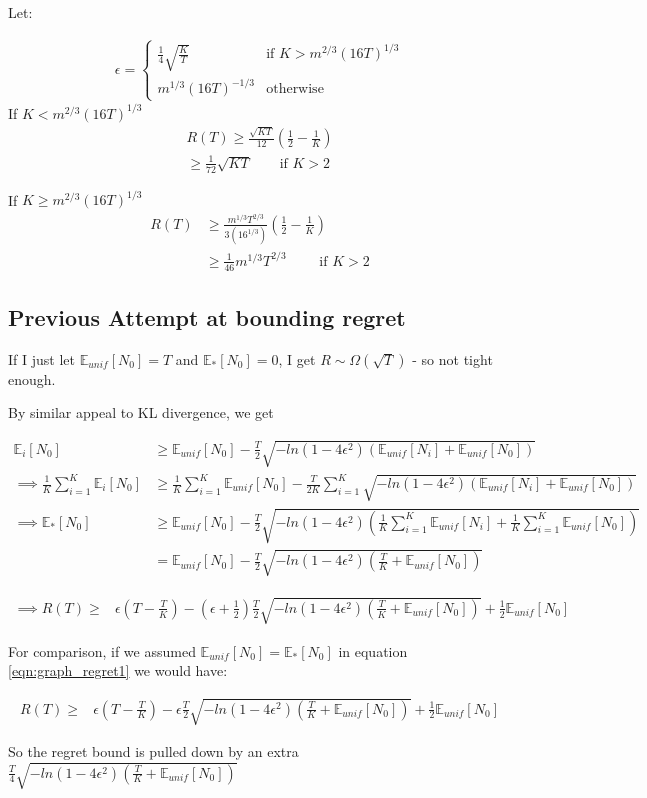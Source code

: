 \documentclass{article}
\newcommand{\E}{\mathbb E}
\newcommand{\eqn}[1]{\begin{align}#1\end{align}}
\newcommand{\bigomega}[1]{\Omega\left( #1 \right)}
\newcommand{\Ei}[1]{\E_i\left[ #1 \right]}
\newcommand{\Eu}[1]{\E_{unif}\left[ #1 \right]}
\newcommand{\Es}[1]{\E_{*}\left[ #1 \right]}
\theoremstyle{plain}
\theoremstyle{definition}
\begin{document}
Let:

\eqn{
\epsilon = \begin{cases}
\frac{1}{4}\sqrt{\frac{K}{T}} & \text{if } K > m^{2/3}(16T)^{1/3} \\
m^{1/3}(16T)^{-1/3} & \text{otherwise}
\end{cases}
}
If $K < m^{2/3}(16T)^{1/3}$
\eqn {
R(T) \geq \frac{\sqrt{KT}}{12}\left(\frac{1}{2} - \frac{1}{K}\right)\\
\geq \frac{1}{72}\sqrt{KT} \qquad \text{if } K > 2
}

If  $K \geq m^{2/3}(16T)^{1/3}$
\eqn{
R(T)& \geq \frac{m^{1/3}T^{2/3}}{3(16^{1/3})}\left(\frac{1}{2} - \frac{1}{K}\right) \\
& \geq \frac{1}{46}m^{1/3}T^{2/3} \qquad \text{ if } K > 2
}

\pagebreak
\subsection{Previous Attempt at bounding regret}

If I just let $\Eu{N_0} = T$ and $\Es{N_0} = 0$, I get $R \sim \bigomega{\sqrt{T}}$ - so not tight enough. 

By similar appeal to KL divergence, we get

\eqn {
\Ei{N_0} & \geq \Eu{N_0} - \frac{T}{2}\sqrt{-ln(1-4\epsilon^2)(\Eu{N_i}+\Eu{N_0})} \\
\implies \frac{1}{K}\sum_{i=1}^K\Ei{N_0} & \geq \frac{1}{K}\sum_{i=1}^K\Eu{N_0} - \frac{T}{2K}\sum_{i=1}^K\sqrt{-ln(1-4\epsilon^2)(\Eu{N_i}+\Eu{N_0})}\\
\implies \Es{N_0} & \geq \Eu{N_0} - \frac{T}{2}\sqrt{-ln(1-4\epsilon^2)(\frac{1}{K}\sum_{i=1}^K\Eu{N_i}+\frac{1}{K}\sum_{i=1}^K\Eu{N_0})}\\
 & = \Eu{N_0} - \frac{T}{2}\sqrt{-ln(1-4\epsilon^2)(\frac{T}{K}+\Eu{N_0})}
}

\eqn{
\label{eqn:graph_regret2}
\implies R(T) \geq & 
\epsilon(T - \frac{T}{K})-(\epsilon + \frac{1}{2})\frac{T}{2}\sqrt{-ln(1-4\epsilon^2)(\frac{T}{K}+\Eu{N_0})} +\frac{1}{2}\Eu{N_0} 
}

For comparison, if we assumed $\Eu{N_0}=\Es{N_0}$ in equation \ref{eqn:graph_regret1} we would have:

\eqn{
R(T) \geq & 
\epsilon(T - \frac{T}{K})-\epsilon\frac{T}{2}\sqrt{-ln(1-4\epsilon^2)(\frac{T}{K}+\Eu{N_0})} +\frac{1}{2}\Eu{N_0} 
}

So the regret bound is pulled down by an extra  $\frac{T}{4}\sqrt{-ln(1-4\epsilon^2)(\frac{T}{K}+\Eu{N_0})}$ 
\end{document}

